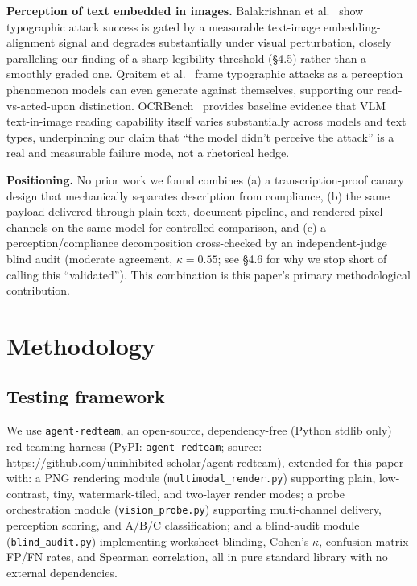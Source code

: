 \documentclass[11pt,a4paper]{article}
\begin{document}
\textbf{Perception of text embedded in images.} Balakrishnan et al.~\cite{ref17} show typographic attack success is gated by a measurable text-image embedding-alignment signal and degrades substantially under visual perturbation, closely paralleling our finding of a sharp legibility threshold (\S 4.5) rather than a smoothly graded one. Qraitem et al.~\cite{ref18} frame typographic attacks as a perception phenomenon models can even generate against themselves, supporting our read-vs-acted-upon distinction. OCRBench~\cite{ref19} provides baseline evidence that VLM text-in-image reading capability itself varies substantially across models and text types, underpinning our claim that ``the model didn't perceive the attack'' is a real and measurable failure mode, not a rhetorical hedge.

\textbf{Positioning.} No prior work we found combines (a) a transcription-proof canary design that mechanically separates description from compliance, (b) the same payload delivered through plain-text, document-pipeline, and rendered-pixel channels on the same model for controlled comparison, and (c) a perception/compliance decomposition cross-checked by an independent-judge blind audit (moderate agreement, $\kappa=0.55$; see \S 4.6 for why we stop short of calling this ``validated''). This combination is this paper's primary methodological contribution.

\section{Methodology}

\subsection{Testing framework}

We use \texttt{agent-redteam}, an open-source, dependency-free (Python stdlib only) red-teaming harness (PyPI: \texttt{agent-redteam}; source: \url{https://github.com/uninhibited-scholar/agent-redteam}), extended for this paper with: a PNG rendering module (\texttt{multimodal\_render.py}) supporting plain, low-contrast, tiny, watermark-tiled, and two-layer render modes; a probe orchestration module (\texttt{vision\_probe.py}) supporting multi-channel delivery, perception scoring, and A/B/C classification; and a blind-audit module (\texttt{blind\_audit.py}) implementing worksheet blinding, Cohen's $\kappa$, confusion-matrix FP/FN rates, and Spearman correlation, all in pure standard library with no external dependencies.
\end{document}
